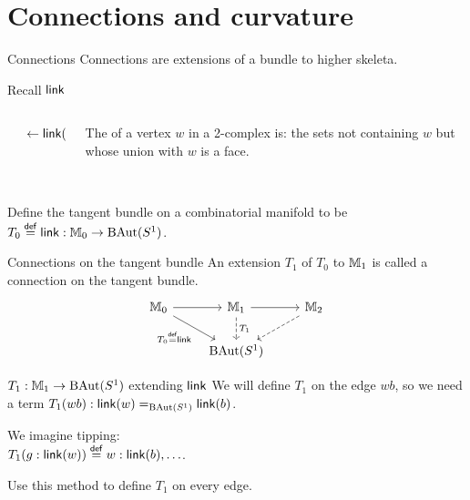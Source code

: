 \section{Connections and curvature}

\begin{frame}{Connections}
Connections are extensions of a bundle to higher skeleta.
\end{frame}

\begin{frame}{Recall \( \operatorname{\mathsf{link}} \)}
\begin{columns}
\begin{column}{0.25\textwidth}

\end{column}
\begin{column}{0.15\textwidth}
\( \leftarrow\operatorname{\mathsf{link}}(w) \)
\end{column}
\begin{column}{0.6\textwidth}
The  of a vertex \( w \) in a 2-complex is: the sets not containing \( w \) but whose union with \( w \) is a face.\\~\\
\end{column}
\end{columns}
Define \alert{the tangent bundle} on a combinatorial manifold to be \( T_0\stackrel{\mathsf{def}}{=}\operatorname{\mathsf{link}}:\mathbb{M}_0\to\operatorname{BAut}(S^1) \).
\end{frame}

\begin{frame}{Connections on the tangent bundle}
An extension \( T_1 \) of \( T_0 \) to \( \mathbb{M}_1 \) is called \alert{a connection on the tangent bundle}.
\[\begin{tikzcd}[ampersand replacement=\&]
  {\mm_0} \& {\mm_1} \& {\mm_2} \\
  \& {\BAut(S^1)}
  \arrow[from=1-1, to=1-2]
  \arrow["{T_0\defeq\link}"', from=1-1, to=2-2]
  \arrow[from=1-2, to=1-3]
  \arrow["{T_1}", dashed, from=1-2, to=2-2]
  \arrow[dashed, from=1-3, to=2-2]
\end{tikzcd}\]
\end{frame}

\begin{frame}{\( T_1:\mathbb{M}_1\to\operatorname{BAut}(S^1) \) extending \( \operatorname{\mathsf{link}} \)}
We will define \( T_1 \) on the edge \( wb \), so we need a term \( T_1(wb):\operatorname{\mathsf{link}}(w)=_{\operatorname{BAut}(S^1)}\operatorname{\mathsf{link}}(b) \).

We imagine tipping:
\[\]
\( T_1(g:\operatorname{\mathsf{link}}(w))\stackrel{\mathsf{def}}{=} w:\operatorname{\mathsf{link}}(b),\ldots \).

Use this method to define \( T_1 \) on every edge.
\end{frame}

